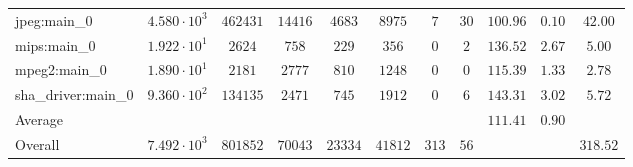 \begin{tabular}{|l|c|c|c|c|c|c|c|c|c|c|}
jpeg:main\_0            & $ 4.580 \cdot 10^{3}  $ & $ 462431 $ & $ 14416 $ & $ 4683  $ & $ 8975  $ & $ 7   $ & $ 30 $ & $ 100.96      $ & $ 0.10    $ & $ 42.00   $ \\
mips:main\_0            & $ 1.922 \cdot 10^{1}  $ & $ 2624   $ & $ 758   $ & $ 229   $ & $ 356   $ & $ 0   $ & $ 2  $ & $ 136.52      $ & $ 2.67    $ & $ 5.00    $ \\
mpeg2:main\_0           & $ 1.890 \cdot 10^{1}  $ & $ 2181   $ & $ 2777  $ & $ 810   $ & $ 1248  $ & $ 0   $ & $ 0  $ & $ 115.39      $ & $ 1.33    $ & $ 2.78    $ \\
sha\_driver:main\_0     & $ 9.360 \cdot 10^{2}  $ & $ 134135 $ & $ 2471  $ & $ 745   $ & $ 1912  $ & $ 0   $ & $ 6  $ & $ 143.31      $ & $ 3.02    $ & $ 5.72    $ \\
\hline
Average                 & $                     $ & $        $ & $       $ & $       $ & $       $ & $     $ & $    $ & $ 111.41      $ & $ 0.90    $ & $         $ \\
\hline
Overall                 & $ 7.492 \cdot 10^{3}  $ & $ 801852 $ & $ 70043 $ & $ 23334 $ & $ 41812 $ & $ 313 $ & $ 56 $ & $             $ & $         $ & $ 318.52  $ \\
\hline
\end{tabular}
